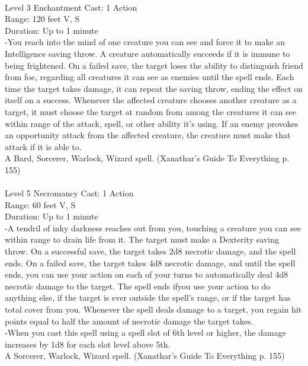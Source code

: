 \documentclass[10pt,twocolumn]{report}
\begin{document}
 \\
Level 3 \quad Enchantment \quad Cast: 1 Action\\
Range: 120 feet \quad V, S\\
Duration: Up to 1 minute \quad \\
-You reach into the mind of one creature you can see and force it to make an Intelligence saving throw. A creature automatically succeeds if it is immune to being frightened. On a failed save, the target loses the ability to distinguish friend from foe, regarding all creatures it can see as enemies until the spell ends. Each time the target takes damage, it can repeat the saving throw, ending the effect on itself on a success. Whenever the affected creature chooses another creature as a target, it must choose the target at random from among the creatures it can see within range of the attack, spell, or other ability it’s using. If an enemy provokes an opportunity attack from the affected creature, the creature must make that attack if it is able to.\\
A Bard, Sorcerer, Warlock, Wizard spell. (Xanathar's Guide To Everything p. 155) \\


 \\
Level 5 \quad Necromancy \quad Cast: 1 Action\\
Range: 60 feet \quad V, S\\
Duration: Up to 1 minute \quad \\
-A tendril of inky darkness reaches out from you, touching a creature you can see within range to drain life from it. The target must make a Dexterity saving throw. On a successful save, the target takes 2d8 necrotic damage, and the spell ends. On a failed save, the target takes 4d8 necrotic damage, and until the spell ends, you can use your action on each of your turns to automatically deal 4d8 necrotic damage to the target. The spell ends ifyou use your action to do anything else, if the target is ever outside the spell’s range, or if the target has total cover from you. Whenever the spell deals damage to a target, you regain hit points equal to half the amount of necrotic damage the target takes.\\
-When you cast this spell using a spell slot of 6th level or higher, the damage increases by 1d8 for each slot level above 5th.\\
A Sorcerer, Warlock, Wizard spell. (Xanathar's Guide To Everything p. 155) \\
\end{document}
